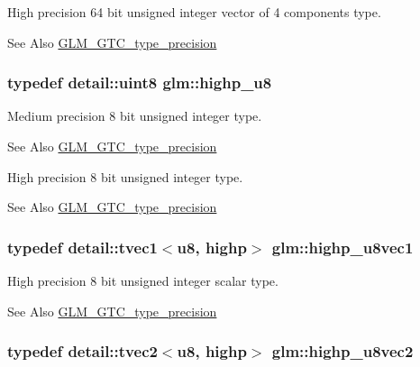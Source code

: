 High precision 64 bit unsigned integer vector of 4 components type. \begin{DoxySeeAlso}{See Also}
\hyperlink{group__gtc__type__precision}{G\-L\-M\-\_\-\-G\-T\-C\-\_\-type\-\_\-precision} 
\end{DoxySeeAlso}
\hypertarget{group__gtc__type__precision_ga8a60abe782749c504fb5ae51eb8b49cc}{
\subsubsection[{highp\-\_\-u8}]{\setlength{\rightskip}{0pt plus 5cm}typedef detail\-::uint8 {\bf glm\-::highp\-\_\-u8}}}\label{group__gtc__type__precision_ga8a60abe782749c504fb5ae51eb8b49cc}
Medium precision 8 bit unsigned integer type. \begin{DoxySeeAlso}{See Also}
\hyperlink{group__gtc__type__precision}{G\-L\-M\-\_\-\-G\-T\-C\-\_\-type\-\_\-precision}
\end{DoxySeeAlso}
High precision 8 bit unsigned integer type. \begin{DoxySeeAlso}{See Also}
\hyperlink{group__gtc__type__precision}{G\-L\-M\-\_\-\-G\-T\-C\-\_\-type\-\_\-precision} 
\end{DoxySeeAlso}
\hypertarget{group__gtc__type__precision_ga8e7e9156357a2b748fe39702c3bdbeec}{
\subsubsection[{highp\-\_\-u8vec1}]{\setlength{\rightskip}{0pt plus 5cm}typedef detail\-::tvec1$<$u8, highp$>$ {\bf glm\-::highp\-\_\-u8vec1}}}\label{group__gtc__type__precision_ga8e7e9156357a2b748fe39702c3bdbeec}
High precision 8 bit unsigned integer scalar type. \begin{DoxySeeAlso}{See Also}
\hyperlink{group__gtc__type__precision}{G\-L\-M\-\_\-\-G\-T\-C\-\_\-type\-\_\-precision} 
\end{DoxySeeAlso}
\hypertarget{group__gtc__type__precision_ga9aed4b3bacd37a43ec369bcf76be144a}{
\subsubsection[{highp\-\_\-u8vec2}]{\setlength{\rightskip}{0pt plus 5cm}typedef detail\-::tvec2$<$u8, highp$>$ {\bf glm\-::highp\-\_\-u8vec2}}}\label{group__gtc__type__precision_ga9aed4b3bacd37a43ec369bcf76be144a}
